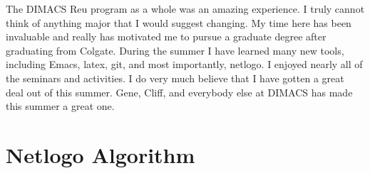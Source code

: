 \documentclass{article}
\begin{document}
The DIMACS Reu program as a whole was an amazing experience. I truly cannot think of anything major that I would suggest changing. My time here has been invaluable and really has motivated me to pursue a graduate degree after graduating from Colgate. During the summer I have learned many new tools, including Emacs, latex, git, and most importantly, netlogo. I enjoyed nearly all of the seminars and activities. I do very much believe that I have gotten a great deal out of this summer. Gene, Cliff, and everybody else at DIMACS has made this summer a great one.






\appendixpage
\appendix
\section{Netlogo Algorithm}
\lstset{breaklines=true, language=Lisp}
\end{document}
